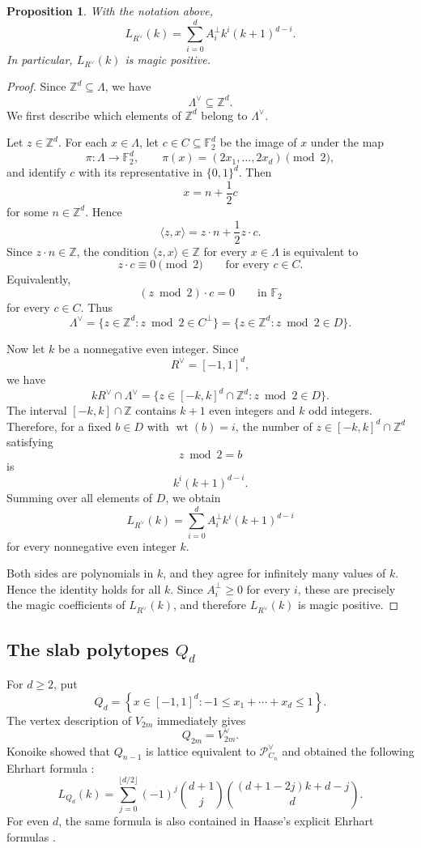 \documentclass[12pt]{amsart}
\newtheorem{Proposition}[Theorem]{Proposition}
\theoremstyle{definition}
\newcommand{\ZZ}{\mathbb Z}
\newcommand{\PP}{\mathcal P}
\begin{document}
\begin{Proposition}\label{prop:crosspolytope-magic}
With the notation above,
\[
L_{R^\vee}(k)
=
\sum_{i=0}^d
A_i^\perp k^i(k+1)^{d-i}.
\]
In particular, $L_{R^\vee}(k)$ is magic positive.
\end{Proposition}

\begin{proof}
Since $\ZZ^d\subseteq\Lambda$, we have
\[
\Lambda^\vee\subseteq\ZZ^d.
\]
We first describe which elements of $\ZZ^d$ belong to $\Lambda^\vee$.

Let $z\in\ZZ^d$.  For each $x\in\Lambda$, let
$c\in C\subseteq\mathbb F_2^d$ be the image of $x$ under the map
\[
\pi:\Lambda\longrightarrow\mathbb F_2^d,
\qquad
\pi(x)=(2x_1,\ldots,2x_d)\pmod 2,
\]
and identify $c$ with its representative in $\{0,1\}^d$.
Then
\[
x=n+\frac12c
\]
for some $n\in\ZZ^d$.  Hence
\[
\langle z,x\rangle
=
z\cdot n+\frac12 z\cdot c.
\]
Since $z\cdot n\in\ZZ$, the condition
$\langle z,x\rangle\in\ZZ$ for every $x\in\Lambda$ is equivalent to
\[
z\cdot c\equiv0\pmod 2
\qquad
\text{for every }c\in C.
\]
Equivalently,
\[
(z\bmod 2)\cdot c=0
\qquad
\text{in }\mathbb F_2
\]
for every $c\in C$.  Thus
\[
\Lambda^\vee
=
\{z\in\ZZ^d:z\bmod2\in C^\perp\}
=
\{z\in\ZZ^d:z\bmod2\in D\}.
\]

Now let $k$ be a nonnegative even integer.  Since
\[
R^\vee=[-1,1]^d,
\]
we have
\[
kR^\vee\cap\Lambda^\vee
=
\{z\in[-k,k]^d\cap\ZZ^d:z\bmod2\in D\}.
\]
The interval $[-k,k]\cap\ZZ$ contains $k+1$ even integers and $k$
odd integers.  Therefore, for a fixed $b\in D$ with
$\operatorname{wt}(b)=i$, the number of $z\in[-k,k]^d\cap\ZZ^d$
satisfying
\[
z\bmod2=b
\]
is
\[
k^i(k+1)^{d-i}.
\]
Summing over all elements of $D$, we obtain
\[
L_{R^\vee}(k)
=
\sum_{i=0}^d
A_i^\perp k^i(k+1)^{d-i}
\]
for every nonnegative even integer $k$.

Both sides are polynomials in $k$, and they agree for infinitely many
values of $k$.  Hence the identity holds for all $k$.  Since
$A_i^\perp\ge0$ for every $i$, these are precisely the magic
coefficients of $L_{R^\vee}(k)$, and therefore
$L_{R^\vee}(k)$ is magic positive.
\end{proof}


\subsection{The slab polytopes \texorpdfstring{$Q_d$}{Q d}}\label{sec:slab}

For $d\ge2$, put
\[
Q_d
=
\left\{
x\in[-1,1]^d:
-1\le x_1+\cdots+x_d\le1
\right\}.
\]
The vertex description of $V_{2m}$ immediately gives
\[
Q_{2m}=V_{2m}^\vee.
\]
Konoike showed that $Q_{n-1}$ is lattice equivalent to
$\PP_{C_n}^\vee$ and obtained the following Ehrhart formula
\cite[Proposition~4.6 and its proof]{KonoikeCycles}:
\begin{equation}\label{eq:Q-ehrhart}
L_{Q_d}(k)
=
\sum_{j=0}^{\lfloor d/2\rfloor}
(-1)^j\binom{d+1}{j}
\binom{(d+1-2j)k+d-j}{d}.
\end{equation}
For even $d$, the same formula is also contained in Haase's explicit
Ehrhart formulas
\cite[Proposition~IV.2.7]{HaaseThesis}.
\end{document}

